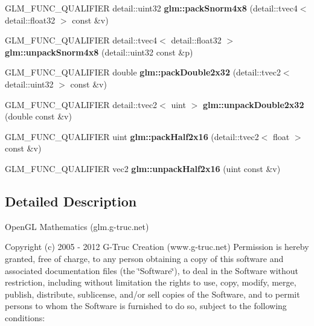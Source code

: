 \begin{DoxyCompactItemize}
\item 
\hypertarget{namespaceglm_a642b59fa9588eee81bea2f35e1556aae}{\-G\-L\-M\-\_\-\-F\-U\-N\-C\-\_\-\-Q\-U\-A\-L\-I\-F\-I\-E\-R detail\-::uint32 {\bfseries glm\-::pack\-Snorm4x8} (detail\-::tvec4$<$ detail\-::float32 $>$ const \&v)}\label{namespaceglm_a642b59fa9588eee81bea2f35e1556aae}

\item 
\hypertarget{namespaceglm_a6873de8f345a4f9dfd8e5f08ca8ce9a2}{\-G\-L\-M\-\_\-\-F\-U\-N\-C\-\_\-\-Q\-U\-A\-L\-I\-F\-I\-E\-R \*
detail\-::tvec4$<$ detail\-::float32 $>$ {\bfseries glm\-::unpack\-Snorm4x8} (detail\-::uint32 const \&p)}\label{namespaceglm_a6873de8f345a4f9dfd8e5f08ca8ce9a2}

\item 
\hypertarget{namespaceglm_a3b29a2a13aeb1e9118d4a7f03597228e}{\-G\-L\-M\-\_\-\-F\-U\-N\-C\-\_\-\-Q\-U\-A\-L\-I\-F\-I\-E\-R double {\bfseries glm\-::pack\-Double2x32} (detail\-::tvec2$<$ detail\-::uint32 $>$ const \&v)}\label{namespaceglm_a3b29a2a13aeb1e9118d4a7f03597228e}

\item 
\hypertarget{namespaceglm_ae5a83256202de4c72af38b9225204323}{\-G\-L\-M\-\_\-\-F\-U\-N\-C\-\_\-\-Q\-U\-A\-L\-I\-F\-I\-E\-R \*
detail\-::tvec2$<$ uint $>$ {\bfseries glm\-::unpack\-Double2x32} (double const \&v)}\label{namespaceglm_ae5a83256202de4c72af38b9225204323}

\item 
\hypertarget{namespaceglm_af8aa8303c4d1547b8a847620045e31f8}{\-G\-L\-M\-\_\-\-F\-U\-N\-C\-\_\-\-Q\-U\-A\-L\-I\-F\-I\-E\-R uint {\bfseries glm\-::pack\-Half2x16} (detail\-::tvec2$<$ float $>$ const \&v)}\label{namespaceglm_af8aa8303c4d1547b8a847620045e31f8}

\item 
\hypertarget{namespaceglm_a4051804cc2c930ba4ca73382b79edf1d}{\-G\-L\-M\-\_\-\-F\-U\-N\-C\-\_\-\-Q\-U\-A\-L\-I\-F\-I\-E\-R vec2 {\bfseries glm\-::unpack\-Half2x16} (uint const \&v)}\label{namespaceglm_a4051804cc2c930ba4ca73382b79edf1d}

\end{DoxyCompactItemize}


\subsection{\-Detailed \-Description}
\-Open\-G\-L \-Mathematics (glm.\-g-\/truc.\-net)

\-Copyright (c) 2005 -\/ 2012 \-G-\/\-Truc \-Creation (www.\-g-\/truc.\-net) \-Permission is hereby granted, free of charge, to any person obtaining a copy of this software and associated documentation files (the \char`\"{}\-Software\char`\"{}), to deal in the \-Software without restriction, including without limitation the rights to use, copy, modify, merge, publish, distribute, sublicense, and/or sell copies of the \-Software, and to permit persons to whom the \-Software is furnished to do so, subject to the following conditions\-:


